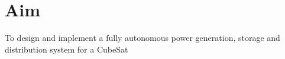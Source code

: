 \chapter{Aim}
To design and implement a fully autonomous power generation, storage and distribution
system for a CubeSat
